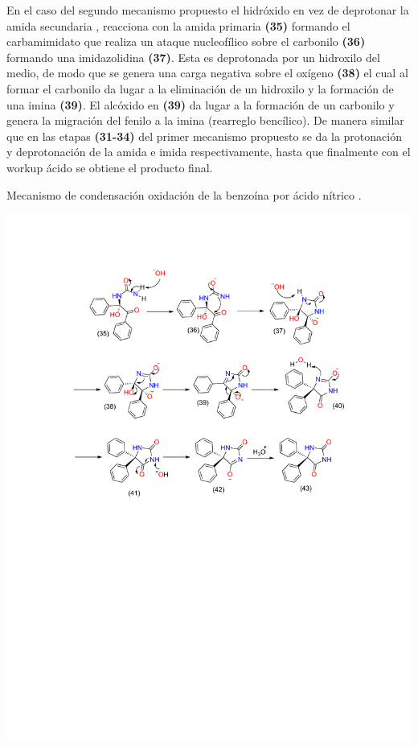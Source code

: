 \documentclass[fleqn,10pt]{SelfArx}
\begin{document}
En el caso del segundo mecanismo propuesto el hidróxido en vez de deprotonar la amida secundaria \cite{mahmoodi2004}\cite{gbaguidi2011}, reacciona con la amida primaria \textbf{(35)} formando el carbamimidato que realiza un ataque nucleofílico sobre el carbonilo \textbf{(36)} formando una imidazolidina \textbf{(37)}. Esta es deprotonada por un hidroxilo del medio, de modo que se genera una carga negativa sobre el oxígeno \textbf{(38)} el cual al formar el carbonilo da lugar a la eliminación de un hidroxilo y la formación de una imina \textbf{(39)}. El alcóxido en \textbf{(39)} da lugar a la formación de un carbonilo y genera la migración del fenilo a la imina (rearreglo bencílico). De manera similar que en las etapas \textbf{(31-34)} del primer mecanismo propuesto se da la protonación y deprotonación de la amida e imida respectivamente, hasta que finalmente con el workup ácido se obtiene el producto final.
\begin{scheme}[h]
	\centering
	\caption{Mecanismo de condensaci\'on oxidaci\'on de la benzo\'ina por \'acido n\'itrico \cite{pavia2010}.}
	\includegraphics[width=\linewidth]{structures/dilantinesquema3.pdf}
\end{scheme}
\end{document}
